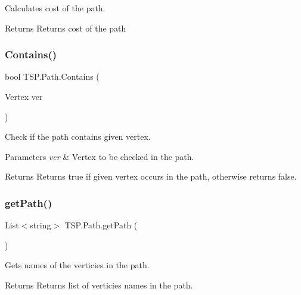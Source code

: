 Calculates cost of the path. 

\begin{DoxyReturn}{Returns}
Returns cost of the path
\end{DoxyReturn}
\mbox{\label{class_t_s_p_1_1_path_a710007cd80209ca53b27e528b062812e}} 
\subsubsection{\texorpdfstring{Contains()}{Contains()}}
{\footnotesize\ttfamily bool T\+S\+P.\+Path.\+Contains (\begin{DoxyParamCaption}\item[{Vertex}]{ver }\end{DoxyParamCaption})\hspace{0.3cm}{\ttfamily [inline]}}



Check if the path contains given vertex. 


\begin{DoxyParams}{Parameters}
{\em ver} & Vertex to be checked in the path.\\
\hline
\end{DoxyParams}
\begin{DoxyReturn}{Returns}
Returns true if given vertex occurs in the path, otherwise returns false.
\end{DoxyReturn}
\mbox{\label{class_t_s_p_1_1_path_afbf4a07bd366d0254c3f6a3853556336}} 
\subsubsection{\texorpdfstring{get\+Path()}{getPath()}}
{\footnotesize\ttfamily List$<$string$>$ T\+S\+P.\+Path.\+get\+Path (\begin{DoxyParamCaption}{ }\end{DoxyParamCaption})\hspace{0.3cm}{\ttfamily [inline]}}



Gets names of the verticies in the path. 

\begin{DoxyReturn}{Returns}
Returns list of verticies names in the path.
\end{DoxyReturn}
\mbox{\label{class_t_s_p_1_1_path_af5f4a7bbbfc9968ed2d279bbf92b6783}} 
